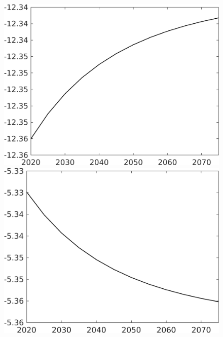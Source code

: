 \documentclass[12pt]{article}
\begin{document}
\begin{figure}[h!!]
\begin{minipage}[]{0.32\textwidth}
\includegraphics[width=1\textwidth]{../../codding_model/own_basedOnFried/optimalPol_010922_revision/figures/all_13Sept22/CompTaul_Equlab_LFBAUPer_Reg0_hh_spillover0_nsk0_xgr0_knspil1_sep1_countec0_GovRev0_etaa0.79.png}
\end{minipage}	
\begin{minipage}[]{0.32\textwidth}
\includegraphics[width=1\textwidth]{../../codding_model/own_basedOnFried/optimalPol_010922_revision/figures/all_13Sept22/CompTaul_Equlab_LFBAUPer_Reg0_hl_spillover0_nsk0_xgr0_knspil1_sep1_countec0_GovRev0_etaa0.79.png}
\end{minipage}	

\end{figure}
\end{document}
